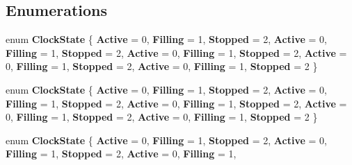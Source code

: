 \subsection*{Enumerations}
\begin{DoxyCompactItemize}
\item 
\mbox{\label{namespace_windows_1_1_u_i_1_1_xaml_1_1_media_1_1_animation_a33c8977536bd838bb2633f3476a7bd0a}} 
enum {\bfseries Clock\+State} \{ \newline
{\bfseries Active} = 0, 
{\bfseries Filling} = 1, 
{\bfseries Stopped} = 2, 
{\bfseries Active} = 0, 
\newline
{\bfseries Filling} = 1, 
{\bfseries Stopped} = 2, 
{\bfseries Active} = 0, 
{\bfseries Filling} = 1, 
\newline
{\bfseries Stopped} = 2, 
{\bfseries Active} = 0, 
{\bfseries Filling} = 1, 
{\bfseries Stopped} = 2, 
\newline
{\bfseries Active} = 0, 
{\bfseries Filling} = 1, 
{\bfseries Stopped} = 2
 \}
\item 
\mbox{\label{namespace_windows_1_1_u_i_1_1_xaml_1_1_media_1_1_animation_a33c8977536bd838bb2633f3476a7bd0a}} 
enum {\bfseries Clock\+State} \{ \newline
{\bfseries Active} = 0, 
{\bfseries Filling} = 1, 
{\bfseries Stopped} = 2, 
{\bfseries Active} = 0, 
\newline
{\bfseries Filling} = 1, 
{\bfseries Stopped} = 2, 
{\bfseries Active} = 0, 
{\bfseries Filling} = 1, 
\newline
{\bfseries Stopped} = 2, 
{\bfseries Active} = 0, 
{\bfseries Filling} = 1, 
{\bfseries Stopped} = 2, 
\newline
{\bfseries Active} = 0, 
{\bfseries Filling} = 1, 
{\bfseries Stopped} = 2
 \}
\item 
\mbox{\label{namespace_windows_1_1_u_i_1_1_xaml_1_1_media_1_1_animation_a33c8977536bd838bb2633f3476a7bd0a}} 
enum {\bfseries Clock\+State} \{ \newline
{\bfseries Active} = 0, 
{\bfseries Filling} = 1, 
{\bfseries Stopped} = 2, 
{\bfseries Active} = 0, 
\newline
{\bfseries Filling} = 1, 
{\bfseries Stopped} = 2, 
{\bfseries Active} = 0, 
{\bfseries Filling} = 1, 

\end{DoxyCompactItemize}
